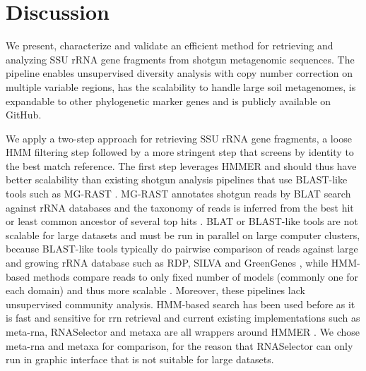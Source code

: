 \documentclass[]{msu-thesis}
\begin{document}
\section{Discussion}

We present, characterize and validate an efficient method for retrieving and analyzing SSU rRNA gene fragments from shotgun metagenomic sequences. The pipeline enables unsupervised diversity analysis with copy number correction on multiple variable regions, has the scalability to handle large soil metagenomes, is expandable to other phylogenetic marker genes and is publicly available on GitHub.

We apply a two-step approach for retrieving SSU rRNA gene fragments, a loose HMM filtering step followed by a more stringent step that screens by identity to the best match reference. The first step leverages HMMER \cite{eddy_new_2009} and should thus have better scalability than existing shotgun analysis pipelines that use BLAST-like tools such as MG-RAST \cite{sunagawa_metagenomic_2013}. MG-RAST annotates shotgun reads by BLAT search against rRNA databases and the taxonomy of reads is inferred from the best hit or least common ancestor of several top hits \cite{meyer_metagenomics_2008,altschul_gapped_1997,kent_blatblast-like_2002}. BLAT or BLAST-like tools are not scalable for large datasets and must be run in parallel on large computer clusters, because BLAST-like tools typically do pairwise comparison of reads against large and growing rRNA database such as RDP, SILVA and GreenGenes \cite{cole_ribosomal_2014,quast_silva_2013,desantis_greengenes_2006}, while HMM-based methods compare reads to only fixed number of models (commonly one for each domain) and thus more scalable \cite{sunagawa_metagenomic_2013}. Moreover, these pipelines lack unsupervised community analysis. HMM-based search has been used before as it is fast and sensitive for rrn retrieval \cite{huang_identification_2009,           lee_rrnaselector:_2011,bengtsson_metaxa:_2011,shah_comparing_2011} and current existing implementations such as meta-rna, RNASelector and metaxa are all wrappers around HMMER \cite{eddy_new_2009}. We chose meta-rna and metaxa for comparison, for the reason that RNASelector can only run in graphic interface that is not suitable for large datasets.
\end{document}
